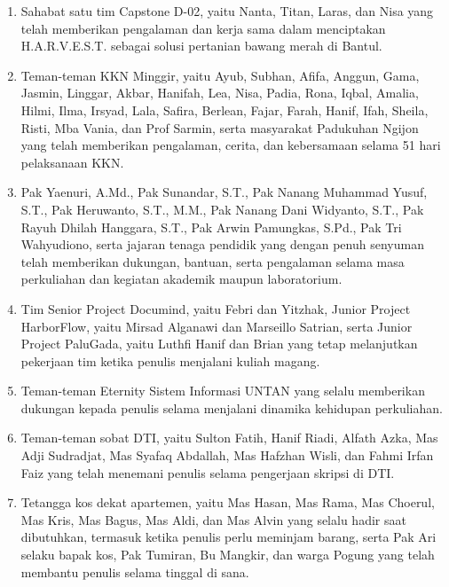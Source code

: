 \begin{enumerate}
	\item Sahabat satu tim Capstone D-02, yaitu Nanta, Titan, Laras, dan Nisa
	yang telah memberikan pengalaman dan kerja sama dalam menciptakan
	H.A.R.V.E.S.T. sebagai solusi pertanian bawang merah di Bantul.
	
	\item Teman-teman KKN Minggir, yaitu Ayub, Subhan, Afifa, Anggun, Gama,
	Jasmin, Linggar, Akbar, Hanifah, Lea, Nisa, Padia, Rona, Iqbal, Amalia,
	Hilmi, Ilma, Irsyad, Lala, Safira, Berlean, Fajar, Farah, Hanif, Ifah,
	Sheila, Risti, Mba Vania, dan Prof Sarmin, serta masyarakat Padukuhan Ngijon yang telah
	memberikan pengalaman, cerita, dan kebersamaan selama 51 hari pelaksanaan
	KKN.
	
	\item Pak Yaenuri, A.Md., Pak Sunandar, S.T., Pak Nanang Muhammad Yusuf,
	S.T., Pak Heruwanto, S.T., M.M., Pak Nanang Dani Widyanto, S.T., Pak Rayuh
	Dhilah Hanggara, S.T., Pak Arwin Pamungkas, S.Pd., Pak Tri Wahyudiono, serta
	jajaran tenaga pendidik yang dengan penuh senyuman telah memberikan dukungan,
	bantuan, serta pengalaman selama masa perkuliahan dan kegiatan akademik
	maupun laboratorium.

	\item Tim Senior Project Documind, yaitu Febri dan Yitzhak, Junior Project
	HarborFlow, yaitu Mirsad Alganawi dan Marseillo Satrian, serta Junior
	Project PaluGada, yaitu Luthfi Hanif dan Brian yang tetap melanjutkan
	pekerjaan tim ketika penulis menjalani kuliah magang.
	
	\item Teman-teman Eternity Sistem Informasi UNTAN yang selalu memberikan
	dukungan kepada penulis selama menjalani dinamika kehidupan perkuliahan.
	
	\item Teman-teman sobat DTI, yaitu Sulton Fatih, Hanif Riadi, Alfath Azka,
	Mas Adji Sudradjat, Mas Syafaq Abdallah, Mas Hafzhan Wisli, dan Fahmi
	Irfan Faiz yang telah menemani penulis selama pengerjaan skripsi di DTI.
	
	\item Tetangga kos dekat apartemen, yaitu Mas Hasan, Mas Rama, Mas
	Choerul, Mas Kris, Mas Bagus, Mas Aldi, dan Mas Alvin yang selalu hadir
	saat dibutuhkan, termasuk ketika penulis perlu meminjam barang, serta Pak
	Ari selaku bapak kos, Pak Tumiran, Bu Mangkir, dan warga Pogung yang telah
	membantu penulis selama tinggal di sana.

\end{enumerate}

